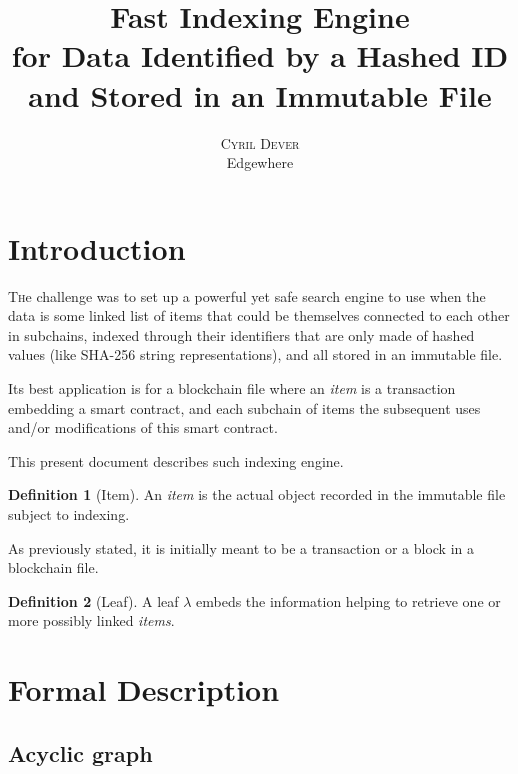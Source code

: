 \documentclass[twoside,twocolumn]{article}
\title{Fast Indexing Engine \\for Data Identified by a Hashed ID \\and Stored in an Immutable File} %
\author{%
    \textsc{Cyril Dever}\\ %
    \normalsize Edgewhere \\ %
}
\date{\DTMusedate{thedate}}
\theoremstyle{definition}
\newtheorem{definition}{Definition}
\theoremstyle{remark}
\begin{document}
\maketitle


\section{Introduction}

\lettrine[nindent=0em,lines=3]{T}he challenge was to set up a powerful yet safe search engine to use when the data is some linked list of items that 
could be themselves connected to each other in subchains, indexed through their identifiers that are only made of hashed values (like SHA-256 string 
representations), and all stored in an immutable file.

Its best application is for a blockchain file where an \emph{item} is a transaction embedding a smart contract, and each subchain of items the 
subsequent uses and/or modifications of this smart contract.

This present document describes such indexing engine.

\begin{definition}[Item]
    \label{item}
    An \emph{item} is the actual object recorded in the immutable file subject to indexing.

    As previously stated, it is initially meant to be a transaction or a block in a blockchain file.
\end{definition}

\begin{definition}[Leaf]
    \label{leaf}
    A leaf $\lambda$ embeds the information helping to retrieve one or more possibly linked \emph{items}.
\end{definition}


\section{Formal Description}

\subsection{Acyclic graph}
\end{document}
